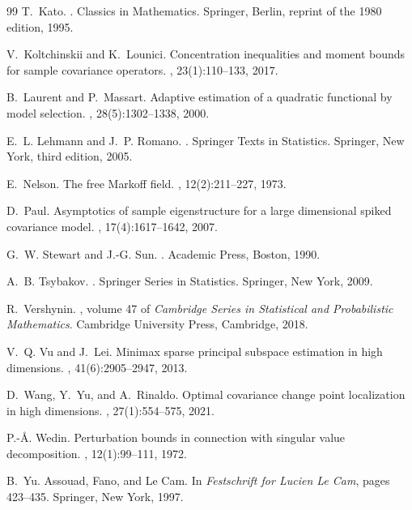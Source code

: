 \documentclass[11pt]{article}
\theoremstyle{tightplain}
\theoremstyle{tightdef}
\begin{document}
\begin{thebibliography}{99}
T.~Kato.
.
\newblock Classics in Mathematics. Springer, Berlin, reprint of the 1980
  edition, 1995.

V.~Koltchinskii and K.~Lounici.
\newblock Concentration inequalities and moment bounds for sample covariance
  operators.
, 23(1):110--133, 2017.

B.~Laurent and P.~Massart.
\newblock Adaptive estimation of a quadratic functional by model selection.
, 28(5):1302--1338, 2000.

E.~L. Lehmann and J.~P. Romano.
.
\newblock Springer Texts in Statistics. Springer, New York, third edition,
  2005.

E.~Nelson.
\newblock The free {M}arkoff field.
, 12(2):211--227, 1973.

D.~Paul.
\newblock Asymptotics of sample eigenstructure for a large dimensional spiked
  covariance model.
, 17(4):1617--1642, 2007.

G.~W. Stewart and J.-G. Sun.
.
\newblock Academic Press, Boston, 1990.

A.~B. Tsybakov.
.
\newblock Springer Series in Statistics. Springer, New York, 2009.

R.~Vershynin.
, volume 47 of {\em Cambridge Series in Statistical and
  Probabilistic Mathematics}.
\newblock Cambridge University Press, Cambridge, 2018.

V.~Q. Vu and J.~Lei.
\newblock Minimax sparse principal subspace estimation in high dimensions.
, 41(6):2905--2947, 2013.

D.~Wang, Y.~Yu, and A.~Rinaldo.
\newblock Optimal covariance change point localization in high dimensions.
, 27(1):554--575, 2021.

P.-{\AA}. Wedin.
\newblock Perturbation bounds in connection with singular value decomposition.
, 12(1):99--111, 1972.

B.~Yu.
\newblock Assouad, {F}ano, and {L}e {C}am.
\newblock In {\em Festschrift for Lucien Le Cam}, pages 423--435. Springer, New
  York, 1997.

\end{thebibliography}
\end{document}
